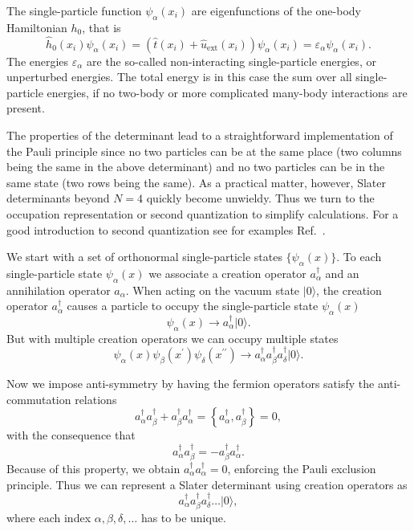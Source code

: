 The single-particle function $\psi_{\alpha}(x_i)$ are eigenfunctions
of the one-body Hamiltonian $h_0$, that is
\[
\hat{h}_0(x_i) \psi_{\alpha}(x_i)=\left(\hat{t}(x_i) +
\hat{u}_{\mathrm{ext}}(x_i)\right)\psi_{\alpha}(x_i)=\varepsilon_{\alpha}\psi_{\alpha}(x_i).
\]
The energies $\varepsilon_{\alpha}$ are the so-called non-interacting
single-particle energies, or unperturbed energies.  The total energy
is in this case the sum over all single-particle energies, if no
two-body or more complicated many-body interactions are present.

The properties of the determinant lead to a straightforward
implementation of the Pauli principle since no two particles can be at
the same place (two columns being the same in the above determinant)
and no two particles can be in the same state (two rows being the
same).  As a practical matter, however, Slater determinants beyond
$N=4$ quickly become unwieldy. Thus we turn to the occupation
  representation or second quantization to simplify
calculations. For a good introduction to second quantization see for
examples Ref.~\cite{shavittbartlett2009}.

We start with a set of orthonormal single-particle states $\{
\psi_{\alpha}(x) \}$.  To each single-particle state
$\psi_{\alpha}(x)$ we associate a creation operator
$a^\dagger_{\alpha}$ and an annihilation operator $a_{\alpha}$.  When
acting on the vacuum state $| 0 \rangle$, the creation operator
$a^\dagger_{\alpha}$ causes a particle to occupy the single-particle
state $\psi_{\alpha}(x)$
\[
\psi_{\alpha}(x) \rightarrow a^\dagger_{\alpha} |0 \rangle.
\]
But with multiple creation operators we can occupy multiple states
\[
\psi_{\alpha}(x) \psi_{\beta}(x^\prime) \psi_{\delta}(x^{\prime
  \prime}) \rightarrow a^\dagger_{\alpha} a^\dagger_{\beta}
a^\dagger_{\delta} |0 \rangle.
\]

Now we impose anti-symmetry by having the fermion operators satisfy
the anti-commutation relations
\[
a^\dagger_{\alpha} a^\dagger_{\beta} + a^\dagger_{\beta}
a^\dagger_{\alpha} = \left\{ a^\dagger_{\alpha}
,a^\dagger_{\beta}\right\}= 0,
\]
with the consequence that
\[
a^\dagger_{\alpha} a^\dagger_{\beta} = - a^\dagger_{\beta}
a^\dagger_{\alpha}.
\]
Because of this property, we obtain $a^\dagger_{\alpha}
a^\dagger_{\alpha} = 0$, enforcing the Pauli exclusion principle.
Thus we can represent a Slater determinant using creation operators as
\[
a^\dagger_{\alpha} a^\dagger_{\beta} a^\dagger_{\delta} \ldots |0\rangle,
\]
where each index $\alpha,\beta,\delta, \ldots$ has to be unique.

